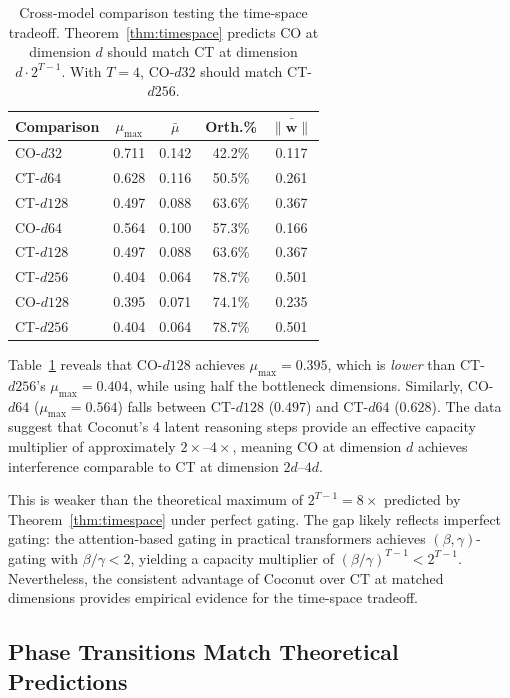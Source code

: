 \begin{table}[t]
\centering
\caption{Cross-model comparison testing the time-space tradeoff. Theorem~\ref{thm:timespace} predicts CO at dimension $d$ should match CT at dimension $d \cdot 2^{T-1}$. With $T=4$, CO-$d32$ should match CT-$d256$.}
\label{tab:timespace}
\small
\begin{tabular}{lcccc}
\toprule
\textbf{Comparison} & $\mu_{\max}$ & $\bar{\mu}$ & \textbf{Orth.\%} & \textbf{$\bar{\|\mathbf{w}\|}$} \\
\midrule
CO-$d32$ & 0.711 & 0.142 & 42.2\% & 0.117 \\
CT-$d64$ & 0.628 & 0.116 & 50.5\% & 0.261 \\
CT-$d128$ & 0.497 & 0.088 & 63.6\% & 0.367 \\
\midrule
CO-$d64$ & 0.564 & 0.100 & 57.3\% & 0.166 \\
CT-$d128$ & 0.497 & 0.088 & 63.6\% & 0.367 \\
CT-$d256$ & 0.404 & 0.064 & 78.7\% & 0.501 \\
\midrule
CO-$d128$ & 0.395 & 0.071 & 74.1\% & 0.235 \\
CT-$d256$ & 0.404 & 0.064 & 78.7\% & 0.501 \\
\bottomrule
\end{tabular}
\end{table}

Table~\ref{tab:timespace} reveals that CO-$d128$ achieves $\mu_{\max} = 0.395$, which is \emph{lower} than CT-$d256$'s $\mu_{\max} = 0.404$, while using half the bottleneck dimensions. Similarly, CO-$d64$ ($\mu_{\max} = 0.564$) falls between CT-$d128$ ($0.497$) and CT-$d64$ ($0.628$). The data suggest that Coconut's 4 latent reasoning steps provide an effective capacity multiplier of approximately $2\times$--$4\times$, meaning CO at dimension $d$ achieves interference comparable to CT at dimension $2d$--$4d$.

This is weaker than the theoretical maximum of $2^{T-1} = 8\times$ predicted by Theorem~\ref{thm:timespace} under perfect gating. The gap likely reflects imperfect gating: the attention-based gating in practical transformers achieves $(\beta, \gamma)$-gating with $\beta/\gamma < 2$, yielding a capacity multiplier of $(\beta/\gamma)^{T-1} < 2^{T-1}$. Nevertheless, the consistent advantage of Coconut over CT at matched dimensions provides empirical evidence for the time-space tradeoff.

\subsection{Phase Transitions Match Theoretical Predictions}
\label{sec:phase_empirical}

